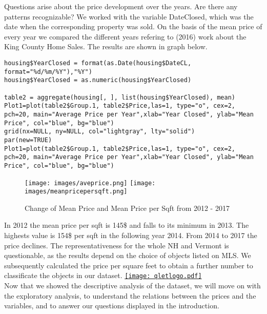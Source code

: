 Questions arise about the price development over the years. Are there any patterns recognizable? We worked with the variable DateClosed, which was the date when the corresponding property was sold. On the basis of the mean price of every year we compared the different years refering to \citeauthor{murilloking} (2016) work about the King County Home Sales.  The results are shown in graph below. \\

\begin{lstlisting}[frame = single,backgroundcolor=\color{hellgelb}]
housing$YearClosed = format(as.Date(housing$DateCL, format="%d/%m/%Y"),"%Y")
housing$YearClosed = as.numeric(housing$YearClosed)

table2 = aggregate(housing[, ], list(housing$YearClosed), mean)
Plot1=plot(table2$Group.1, table2$Price,las=1, type="o", cex=2, pch=20, main="Average Price per Year",xlab="Year Closed", ylab="Mean Price", col="blue", bg="blue")
grid(nx=NULL, ny=NULL, col="lightgray", lty="solid")
par(new=TRUE)
Plot1=plot(table2$Group.1, table2$Price,las=1, type="o", cex=2, pch=20, main="Average Price per Year",xlab="Year Closed", ylab="Mean Price", col="blue", bg="blue")
\end{lstlisting}

\begin{figure}[ht]
\centering
	\texttt{[image: images/aveprice.png]}
	\texttt{[image: images/meanpricepersqft.png]}
	\caption{Change of Mean Price and Mean Price per Sqft from 2012 - 2017}
\label{}
\end{figure}


In 2012 the mean price  per sqft is 145\$  and falls to its minimum in 2013. The highests value is 154\$ per sqft in the following year 2014. From 2014 to 2017 the price declines.
The representativeness for the whole NH and Vermont is questionable, as the results depend on the choice of objects listed on MLS.
We subsequently calculated the price per square feet to obtain a further number to classificate the objects in our dataset. \href{https://github.com/arminecseri/SPL-SOSE-17/blob/master/Timeplots.R}{\texttt{[image: qletlogo.pdf]}}\\





Now that we showed the descriptive analysis of the dataset, we will move on with the exploratory analysis, to understand the relations between the prices and the variables, and to answer our questions displayed in the introduction. \\
